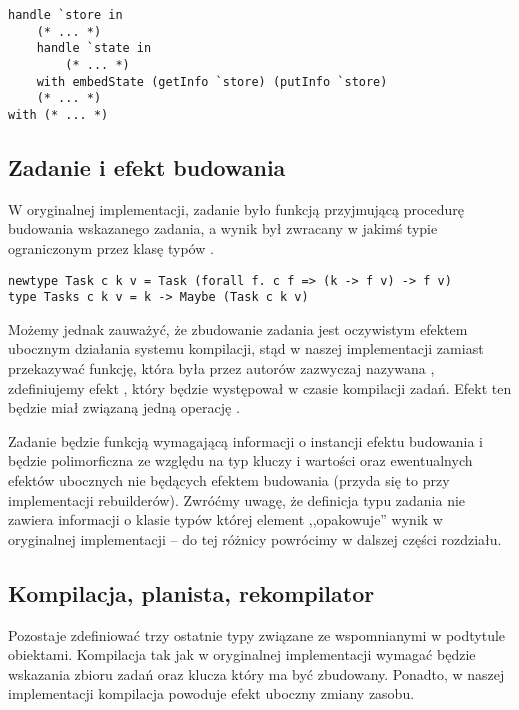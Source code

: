 \begin{lstlisting}[language=Haleff, float=h, caption={Wykorzystanie \helinl{embedState}}]
handle `store in
    (* ... *)
    handle `state in
        (* ... *)
    with embedState (getInfo `store) (putInfo `store)
    (* ... *)
with (* ... *)
\end{lstlisting}

\subsection{Zadanie i efekt budowania}

W oryginalnej implementacji, zadanie było funkcją przyjmującą procedurę budowania wskazanego zadania, a wynik był zwracany w jakimś typie  ograniczonym przez klasę typów .

\begin{lstlisting}[style=haskell-style]
newtype Task c k v = Task (forall f. c f => (k -> f v) -> f v)
type Tasks c k v = k -> Maybe (Task c k v)
\end{lstlisting}

Możemy jednak zauważyć, że zbudowanie zadania jest oczywistym efektem ubocznym działania systemu kompilacji, stąd w naszej implementacji zamiast przekazywać funkcję, która była przez autorów zazwyczaj nazywana , zdefiniujemy efekt , który będzie występował w czasie kompilacji zadań. Efekt ten będzie miał związaną jedną operację .



Zadanie będzie funkcją wymagającą informacji o instancji efektu budowania i będzie polimorficzna ze względu na typ kluczy i wartości oraz ewentualnych efektów ubocznych nie będących efektem budowania (przyda się to przy implementacji rebuilderów). Zwróćmy uwagę, że definicja typu zadania nie zawiera informacji o klasie typów  której element  ,,opakowuje'' wynik w oryginalnej implementacji -- do tej różnicy powrócimy w dalszej części rozdziału.

\subsection{Kompilacja, planista, rekompilator}

Pozostaje zdefiniować trzy ostatnie typy związane ze wspomnianymi w podtytule obiektami. Kompilacja tak jak w oryginalnej implementacji wymagać będzie wskazania zbioru zadań oraz klucza który ma być zbudowany. Ponadto, w  naszej implementacji kompilacja powoduje efekt uboczny zmiany zasobu.

